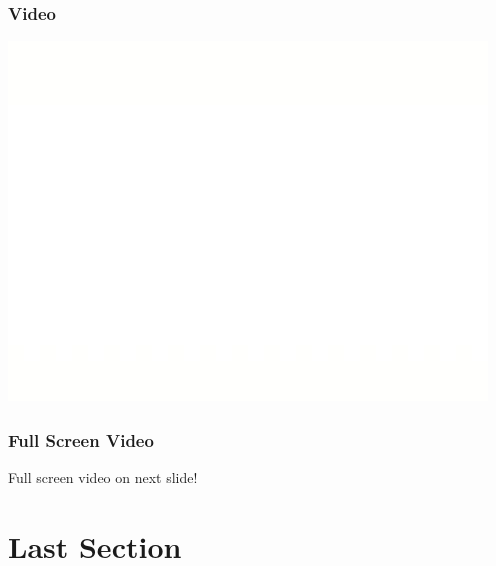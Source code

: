 \documentclass{beamer}
\begin{document}
\begin{frame} \frametitle{Video}
\begin{center}
\href{run:video/femtost.mp4?autostart&loop}{\includegraphics[height=0.7\textheight]{video/femtost.jpg}}
\end{center}
\end{frame}

\begin{frame}
\frametitle{Full Screen Video}
\begin{center}
Full screen video on next slide!
\end{center}
\end{frame}


\section{Last Section}
\end{document}
